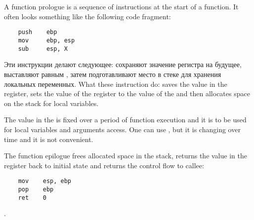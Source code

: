 \chapter{}
\label{sec:prologepilog}

{A function prologue is a sequence of instructions at the start of a function. It often looks something like the following
code fragment:}

\begin{lstlisting}
    push    ebp
    mov     ebp, esp
    sub     esp, X
\end{lstlisting}

\IFRU
{Эти инструкции делают следующее: сохраняют значение регистра \EBP на будущее, выставляют \EBP равным \ESP, 
затем подготавливают место в стеке для хранения локальных переменных.}
{What these instruction do: saves the value in the \EBP register,
sets the value of the \EBP register to the value of the \ESP and then allocates space on the stack 
for local variables.}

{The value in the \EBP is fixed over a period of function execution and it is to be used for local variables and 
arguments access. 
One can use \ESP, but it is changing over time and it is not convenient.}

{The function epilogue frees allocated space in the stack, returns the value in the \EBP register back to initial state 
and returns the control flow to \gls{callee}:}

\begin{lstlisting}
    mov    esp, ebp
    pop    ebp
    ret    0
\end{lstlisting}

.

\section{\Recursion}

